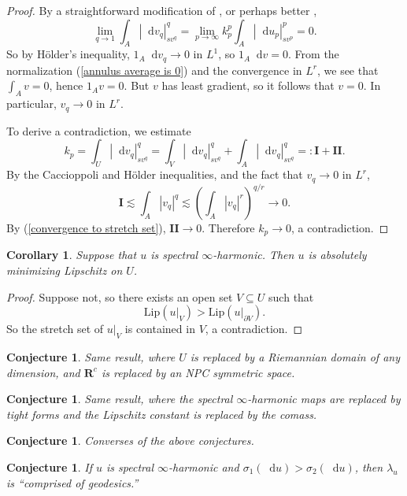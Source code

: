 \documentclass[reqno,11pt]{amsart}
\newcommand{\RR}{\mathbf{R}}
\newcommand*\dif{\mathop{}\!\mathrm{d}}
\newcommand{\Lip}{\mathrm{Lip}}
\newtheorem{corollary}[theorem]{Corollary}
\newtheorem{conjecture}[theorem]{Conjecture}
\theoremstyle{definition}
\numberwithin{equation}{section}
\begin{document}
\begin{proof}
By a straightforward modification of \cite[Proposition 6.5]{daskalopoulos2022transverse}, or perhaps better \cite[Theorem 7.1]{daskalopoulos2022analytic},
\begin{equation}\label{convergence to stretch set}
\lim_{q \to 1} \int_A |\dif v_q|_{sv^q}^q = \lim_{p \to \infty} k_p^p \int_A |\dif u_p|_{sv^p}^p = 0.
\end{equation}
So by H\"older's inequality, $1_A \dif v_q \to 0$ in $L^1$, so $1_A \dif v = 0$.
From the normalization (\ref{annulus average is 0}) and the convergence in $L^r$, we see that $\int_A v = 0$, hence $1_A v = 0$.
But $v$ has least gradient, so it follows that $v = 0$.
In particular, $v_q \to 0$ in $L^r$.

To derive a contradiction, we estimate
$$k_p = \int_U |\dif v_q|_{sv^q}^q = \int_V |\dif v_q|_{sv^q}^q + \int_A |\dif v_q|_{sv^q}^q =: \mathbf{I} + \mathbf{II}.$$
By the Caccioppoli and H\"older inequalities, and the fact that $v_q \to 0$ in $L^r$,
$$\mathbf{I} \lesssim \int_A |v_q|^q \lesssim \left(\int_A |v_q|^r\right)^{q/r} \to 0.$$
By (\ref{convergence to stretch set}), $\mathbf{II} \to 0$.
Therefore $k_p \to 0$, a contradiction.
\end{proof}

\begin{corollary}
Suppose that $u$ is spectral $\infty$-harmonic.
Then $u$ is absolutely minimizing Lipschitz on $U$.
\end{corollary}
\begin{proof}
Suppose not, so there exists an open set $V \subseteq U$ such that 
$$\Lip(u|_V) > \Lip(u|_{\partial V}).$$
So the stretch set of $u|_V$ is contained in $V$, a contradiction.
\end{proof}

\begin{conjecture}
Same result, where $U$ is replaced by a Riemannian domain of any dimension, and $\RR^c$ is replaced by an NPC symmetric space.
\end{conjecture}

\begin{conjecture}
Same result, where the spectral $\infty$-harmonic maps are replaced by tight forms and the Lipschitz constant is replaced by the comass.
\end{conjecture}

\begin{conjecture}
Converses of the above conjectures.
\end{conjecture}

\begin{conjecture}
If $u$ is spectral $\infty$-harmonic and $\sigma_1(\dif u) > \sigma_2(\dif u)$, then $\lambda_u$ is ``comprised of geodesics.''
\end{conjecture}


\printbibliography
\end{document}
